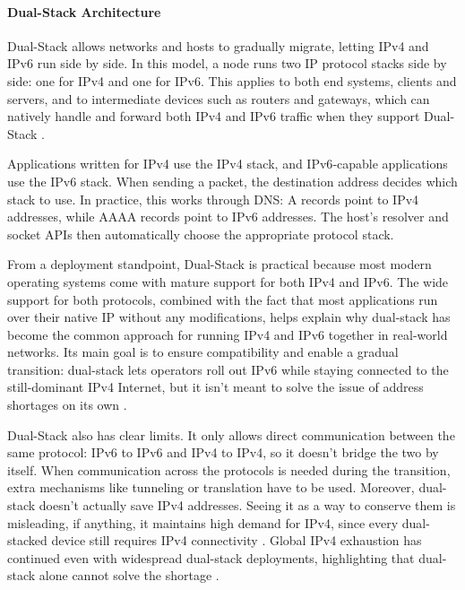 \paragraph{Dual-Stack Architecture} 

Dual-Stack allows networks and hosts to gradually migrate, letting IPv4 and IPv6 run side by side\cite{punithavathani2009ipv4}. In this model, a node runs two IP protocol stacks side by side: one for IPv4 and one for IPv6. This applies to both end systems, clients and servers, and to intermediate devices such as routers and gateways, which can natively handle and forward both IPv4 and IPv6 traffic when they support Dual-Stack \cite{punithavathani2009ipv4}.

Applications written for IPv4 use the IPv4 stack, and IPv6‑capable applications use the IPv6 stack. When sending a packet, the destination address decides which stack to use\cite{rfc4213}. In practice, this works through DNS: A records point to IPv4 addresses, while AAAA records point to IPv6 addresses. The host’s resolver and socket APIs then automatically choose the appropriate protocol stack\cite{punithavathani2009ipv4}.

From a deployment standpoint, Dual-Stack is practical because most modern operating systems come with mature support for both IPv4 and IPv6\cite{rfc7381}. The wide support for both protocols, combined with the fact that most applications run over their native IP without any modifications, helps explain why dual-stack has become the common approach for running IPv4 and IPv6 together in real-world networks\cite{punithavathani2009ipv4}. Its main goal is to ensure compatibility and enable a gradual transition: dual-stack lets operators roll out IPv6 while staying connected to the still-dominant IPv4 Internet, but it isn’t meant to solve the issue of address shortages on its own \cite{LEVIN20141059}.

Dual-Stack also has clear limits. It only allows direct communication between the same protocol: IPv6 to IPv6 and IPv4 to IPv4, so it doesn't bridge the two by itself. When communication across the protocols is needed during the transition, extra mechanisms like tunneling or translation have to be used\cite{punithavathani2009ipv4}. Moreover, dual-stack doesn’t actually save IPv4 addresses. Seeing it as a way to conserve them is misleading, if anything, it maintains high demand for IPv4, since every dual-stacked device still requires IPv4 connectivity\cite{rfc4241} . Global IPv4 exhaustion has continued even with widespread dual-stack deployments, highlighting that dual-stack alone cannot solve the shortage \cite{LEVIN20141059}.

